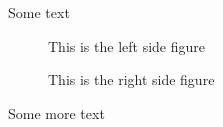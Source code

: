 \documentclass{article}
\begin{document}
Some text
\begin{figure}[p]%
\begin{leftfullpage}
This is the left side figure
\end{leftfullpage}
\end{figure}
\begin{figure}[p]%
\begin{fullpage}
This is the right side figure
\end{fullpage}
\end{figure}
Some more text
\end{document}

